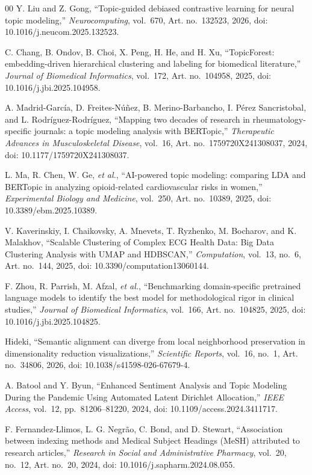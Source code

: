 \documentclass[a4paper,10pt,conference]{IEEEtran}
\begin{document}
\begin{thebibliography}{00}
 Y. Liu and Z. Gong, ``Topic-guided debiased contrastive learning for neural topic modeling,'' \textit{Neurocomputing}, vol.~670, Art. no.~132523, 2026, doi: 10.1016/j.neucom.2025.132523.

 C. Chang, B. Ondov, B. Choi, X. Peng, H. He, and H. Xu, ``TopicForest: embedding-driven hierarchical clustering and labeling for biomedical literature,'' \textit{Journal of Biomedical Informatics}, vol.~172, Art. no.~104958, 2025, doi: 10.1016/j.jbi.2025.104958.

 A. Madrid-García, D. Freites-Núñez, B. Merino-Barbancho, I. Pérez Sancristobal, and L. Rodríguez-Rodríguez, ``Mapping two decades of research in rheumatology-specific journals: a topic modeling analysis with BERTopic,'' \textit{Therapeutic Advances in Musculoskeletal Disease}, vol.~16, Art. no.~1759720X241308037, 2024, doi: 10.1177/1759720X241308037.

 L. Ma, R. Chen, W. Ge, \textit{et al.}, ``AI-powered topic modeling: comparing LDA and BERTopic in analyzing opioid-related cardiovascular risks in women,'' \textit{Experimental Biology and Medicine}, vol.~250, Art. no.~10389, 2025, doi: 10.3389/ebm.2025.10389.

 V. Kaverinskiy, I. Chaikovsky, A. Mnevets, T. Ryzhenko, M. Bocharov, and K. Malakhov, ``Scalable Clustering of Complex ECG Health Data: Big Data Clustering Analysis with UMAP and HDBSCAN,'' \textit{Computation}, vol.~13, no.~6, Art. no.~144, 2025, doi: 10.3390/computation13060144.

 F. Zhou, R. Parrish, M. Afzal, \textit{et al.}, ``Benchmarking domain-specific pretrained language models to identify the best model for methodological rigor in clinical studies,'' \textit{Journal of Biomedical Informatics}, vol.~166, Art. no.~104825, 2025, doi: 10.1016/j.jbi.2025.104825.

 Hideki, ``Semantic alignment can diverge from local neighborhood preservation in dimensionality reduction visualizations,'' \textit{Scientific Reports}, vol.~16, no.~1, Art. no.~34806, 2026, doi: 10.1038/s41598-026-67679-4.

 A. Batool and Y. Byun, ``Enhanced Sentiment Analysis and Topic Modeling During the Pandemic Using Automated Latent Dirichlet Allocation,'' \textit{IEEE Access}, vol.~12, pp.~81206--81220, 2024, doi: 10.1109/access.2024.3411717.

 F. Fernandez-Llimos, L. G. Negrão, C. Bond, and D. Stewart, ``Association between indexing methods and Medical Subject Headings (MeSH) attributed to research articles,'' \textit{Research in Social and Administrative Pharmacy}, vol.~20, no.~12, Art. no.~20, 2024, doi: 10.1016/j.sapharm.2024.08.055.


\end{thebibliography}
\end{document}
